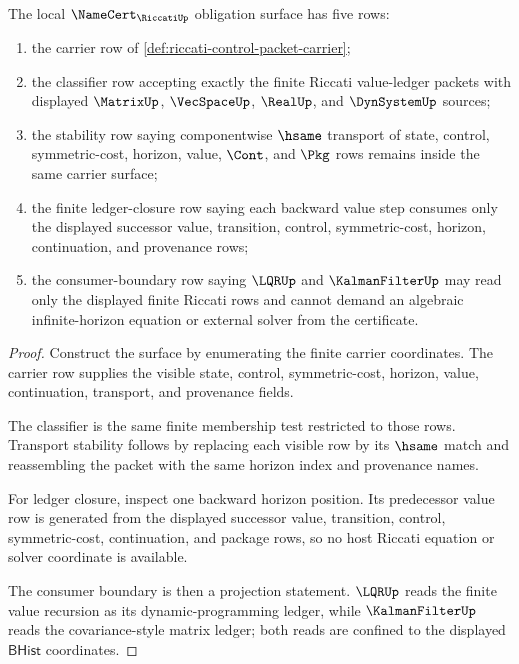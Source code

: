 \begin{theorem}
\label{thm:riccati-namecert-obligation-surface}
The local $\NameCert_{\RiccatiUp}$ obligation surface has five rows:
\begin{enumerate}
\item the carrier row of \autoref{def:riccati-control-packet-carrier};
\item the classifier row accepting exactly the finite Riccati value-ledger
packets with displayed $\MatrixUp$, $\VecSpaceUp$, $\RealUp$, and $\DynSystemUp$
sources;
\item the stability row saying componentwise $\hsame$ transport of state,
control, symmetric-cost, horizon, value, $\Cont$, and $\Pkg$ rows remains inside
the same carrier surface;
\item the finite ledger-closure row saying each backward value step consumes
only the displayed successor value, transition, control, symmetric-cost,
horizon, continuation, and provenance rows;
\item the consumer-boundary row saying $\LQRUp$ and $\KalmanFilterUp$ may read
only the displayed finite Riccati rows and cannot demand an algebraic
infinite-horizon equation or external solver from the certificate.
\end{enumerate}
\end{theorem}
\begin{proof}
Construct the surface by enumerating the finite carrier coordinates. The carrier
row supplies the visible state, control, symmetric-cost, horizon, value,
continuation, transport, and provenance fields.

The classifier is the same finite membership test restricted to those rows.
Transport stability follows by replacing each visible row by its $\hsame$ match
and reassembling the packet with the same horizon index and provenance names.

For ledger closure, inspect one backward horizon position. Its predecessor value
row is generated from the displayed successor value, transition, control,
symmetric-cost, continuation, and package rows, so no host Riccati equation or
solver coordinate is available.

The consumer boundary is then a projection statement. $\LQRUp$ reads the finite
value recursion as its dynamic-programming ledger, while $\KalmanFilterUp$ reads
the covariance-style matrix ledger; both reads are confined to the displayed
$\mathsf{BHist}$ coordinates.
\end{proof}

